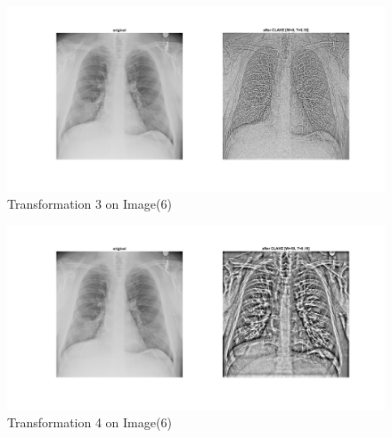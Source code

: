 \documentclass[12pt, a4paper]{article}
\begin{document}
\renewcommand{\thefigure}{5.63}
\begin{figure}[H]
    \centering
    \vspace*{-30pt}
    \includegraphics[width=\textwidth]{e63.jpg}
    \vspace*{-60pt}
    \caption{Transformation 3 on Image(6)}
    \label{fig:5.63}
\end{figure}
\renewcommand{\thefigure}{5.64}
\begin{figure}[H]
    \centering
    \includegraphics[width=\textwidth]{e64.jpg}
    \vspace*{-60pt}
    \caption{Transformation 4 on Image(6)}
    \label{fig:5.64}
\end{figure}
\end{document}
